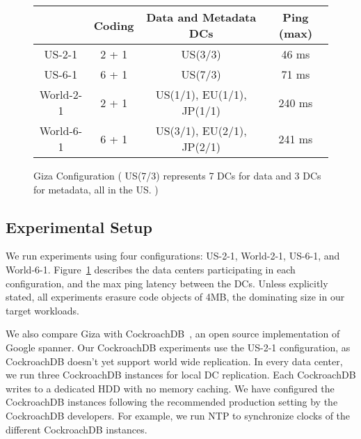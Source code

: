 \begin{figure}
\footnotesize
\centering
\begin{tabular}{c|c|c|c}
          & Coding & Data and Metadata DCs & Ping (max)\\
\hline
US-2-1 	  & 2 + 1 & US(3/3)                   & 46 ms \\
US-6-1 	  & 6 + 1 & US(7/3)                   & 71 ms\\ 
World-2-1 & 2 + 1 & US(1/1), EU(1/1), JP(1/1) & 240 ms\\
World-6-1 & 6 + 1 & US(3/1), EU(2/1), JP(2/1) & 241 ms\\
\end{tabular}
\caption{Giza Configuration ( US(7/3) represents 7 DCs for data and 3 DCs for metadata, all in the US. )} 
\label{fig:dcconfig} 
\end{figure}

\subsection{Experimental Setup}
We run experiments using four configurations: US-2-1, World-2-1, US-6-1, and World-6-1. Figure~\ref{fig:dcconfig} describes the data centers participating in each configuration, and the max ping latency between the DCs. Unless explicitly stated, all experiments erasure code objects of 4MB, the dominating size in our target workloads.

We also compare Giza with CockroachDB~\cite{cockroachdb}, an open source implementation of Google spanner. Our CockroachDB experiments use the US-2-1 configuration, as CockroachDB doesn't yet support world wide replication. In every data center, we run three CockroachDB instances for local DC replication. Each CockroachDB writes to a dedicated HDD with no memory caching. We have configured the CockroachDB instances following the recommended production setting by the CockroachDB developers. For example, we run NTP to synchronize clocks of the different CockroachDB instances.


